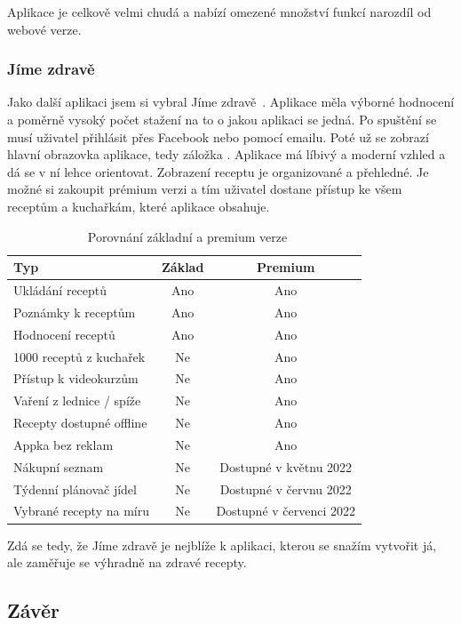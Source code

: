 Aplikace je celkově velmi chudá a nabízí omezené množství funkcí narozdíl od webové verze.

\subsubsection{Jíme zdravě}
Jako další aplikaci jsem si vybral Jíme zdravě~\cite{JimeZdrave}. Aplikace měla výborné hodnocení a poměrně vysoký počet stažení na to o jakou aplikaci se jedná.
Po spuštění se musí uživatel přihlásit přes Facebook nebo pomocí emailu. Poté už se zobrazí hlavní obrazovka aplikace, tedy záložka .
Aplikace má líbivý a moderní vzhled a dá se v ní lehce orientovat. Zobrazení receptu je organizované a přehledné. Je možné si zakoupit
prémium verzi a tím uživatel dostane přístup ke všem receptům a kuchařkám, které aplikace obsahuje.

\begin{table}[H]\centering
\caption{~Porovnání základní a premium verze}\label{tab:jimezdrave:zakladpremium}
\begin{tabular}{l|c|c}
    Typ		                                    & Základ    & Premium   \tabularnewline \hline
    Ukládání receptů		                    & Ano		& Ano       \tabularnewline \hline
    Poznámky k receptům	                        & Ano       & Ano       \tabularnewline \hline
    Hodnocení receptů	                        & Ano		& Ano       \tabularnewline \hline
    1000 receptů z kuchařek	                    & Ne		& Ano       \tabularnewline \hline
    Přístup k videokurzům	                    & Ne		& Ano       \tabularnewline \hline
    Vaření z lednice / spíže                    & Ne        & Ano       \tabularnewline \hline
    Recepty dostupné offline                    & Ne        & Ano       \tabularnewline \hline
    Appka bez reklam                            & Ne        & Ano       \tabularnewline \hline
    Nákupní seznam                              & Ne        & Dostupné v květnu 2022    \tabularnewline \hline
    Týdenní plánovač jídel                      & Ne        & Dostupné v červnu 2022    \tabularnewline \hline
    Vybrané recepty na míru                     & Ne        & Dostupné v červenci 2022  \tabularnewline
\end{tabular}
\end{table}

Zdá se tedy, že Jíme zdravě je nejblíže k aplikaci, kterou se snažím vytvořit já, ale zaměřuje se výhradně na zdravé recepty.

\subsection{Závěr}

